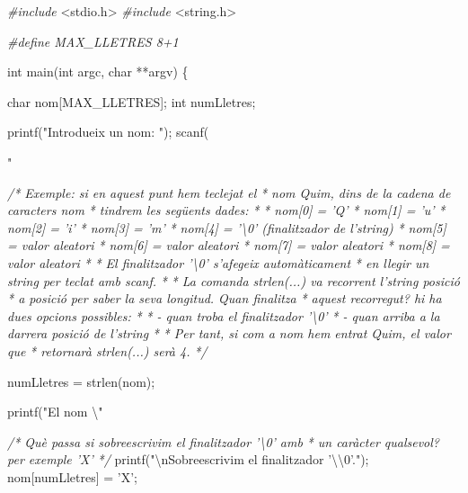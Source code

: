 \documentclass[]{book}
\newenvironment{Shaded}{\begin{snugshade}}{\end{snugshade}}
\newcommand{\DataTypeTok}[1]{\textcolor[rgb]{0.13,0.29,0.53}{#1}}
\newcommand{\CharTok}[1]{\textcolor[rgb]{0.31,0.60,0.02}{#1}}
\newcommand{\SpecialCharTok}[1]{\textcolor[rgb]{0.00,0.00,0.00}{#1}}
\newcommand{\StringTok}[1]{\textcolor[rgb]{0.31,0.60,0.02}{#1}}
\newcommand{\ImportTok}[1]{#1}
\newcommand{\CommentTok}[1]{\textcolor[rgb]{0.56,0.35,0.01}{\textit{#1}}}
\newcommand{\PreprocessorTok}[1]{\textcolor[rgb]{0.56,0.35,0.01}{\textit{#1}}}
\newcommand{\NormalTok}[1]{#1}
\begin{document}
\begin{Shaded}
\begin{Highlighting}[]
\PreprocessorTok{#include }\ImportTok{<stdio.h>}
\PreprocessorTok{#include }\ImportTok{<string.h>}

\PreprocessorTok{#define MAX_LLETRES 8+1}

\DataTypeTok{int}\NormalTok{ main(}\DataTypeTok{int}\NormalTok{ argc, }\DataTypeTok{char}\NormalTok{ **argv) \{}

    \DataTypeTok{char}\NormalTok{ nom[MAX_LLETRES];}
    \DataTypeTok{int}\NormalTok{ numLletres;}

\NormalTok{    printf(}\StringTok{"Introdueix un nom: "}\NormalTok{);}
\NormalTok{    scanf(}\StringTok{"%

    \CommentTok{/* Exemple: si en aquest punt hem teclejat el}
\CommentTok{     * nom Quim, dins de la cadena de caracters nom}
\CommentTok{     * tindrem les següents dades:}
\CommentTok{     *}
\CommentTok{     * nom[0] = 'Q'}
\CommentTok{     * nom[1] = 'u'}
\CommentTok{     * nom[2] = 'i'}
\CommentTok{     * nom[3] = 'm'}
\CommentTok{     * nom[4] = '\textbackslash{}0' (finalitzador de l'string)}
\CommentTok{     * nom[5] = valor aleatori}
\CommentTok{     * nom[6] = valor aleatori}
\CommentTok{     * nom[7] = valor aleatori}
\CommentTok{     * nom[8] = valor aleatori}
\CommentTok{     *}
\CommentTok{     * El finalitzador '\textbackslash{}0' s'afegeix automàticament}
\CommentTok{     * en llegir un string per teclat amb scanf.}
\CommentTok{     * }
\CommentTok{     * La comanda strlen(...) va recorrent l'string posició}
\CommentTok{     * a posició per saber la seva longitud. Quan finalitza}
\CommentTok{     * aquest recorregut? hi ha dues opcions possibles:}
\CommentTok{     *}
\CommentTok{     * - quan troba el finalitzador '\textbackslash{}0'}
\CommentTok{     * - quan arriba a la darrera posició de l'string}
\CommentTok{     *}
\CommentTok{     * Per tant, si com a nom hem entrat Quim, el valor que }
\CommentTok{     * retornarà strlen(...) serà 4.}
\CommentTok{     */}

\NormalTok{    numLletres = strlen(nom);}

\NormalTok{    printf(}\StringTok{"El nom }\SpecialCharTok{\textbackslash{}"}\StringTok{%

    \CommentTok{/* Què passa si sobreescrivim el finalitzador '\textbackslash{}0' amb}
\CommentTok{     * un caràcter qualsevol? per exemple 'X'}
\CommentTok{     */}
\NormalTok{    printf(}\StringTok{"}\SpecialCharTok{\textbackslash{}n}\StringTok{Sobreescrivim el finalitzador '}\SpecialCharTok{\textbackslash{}\textbackslash{}}\StringTok{0'."}\NormalTok{);}
\NormalTok{    nom[numLletres] = }\CharTok{'X'}\NormalTok{;}

}}
\end{Highlighting}
\end{Shaded}
\end{document}

